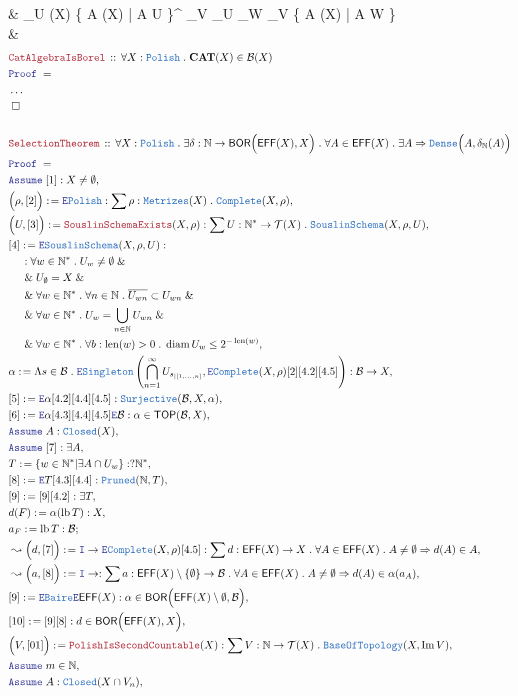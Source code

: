 \documentclass[12pt]{scrartcl}
\newcommand{\TYPE}[1]{\textcolor{NavyBlue}{\mathtt{#1}}}
\newcommand{\LOGIC}[1]{\textcolor{Blue}{\mathtt{#1}}}
\newcommand{\THM}[1]{\textcolor{Maroon}{\mathtt{#1}}}
\renewcommand{\.}{\; . \;}
\newcommand{\de}{: \kern 0.1pc =}
\newcommand{\Theorem}[2]{& \THM{#1} \, :: \, #2 \\ & \Proof = \\ }
\newcommand{\NewLine}{\\ & \kern 1pc}
\newcommand{\Page}[1]{ \begin{align*} #1 \end{align*}   }
\newcommand{\NoProof}{ & \ldots \\ \EndProof}
\renewcommand{\And}{\; \& \;}
\newcommand{\Imply}{\Rightarrow}
\newcommand{\Intro}{\LOGIC{I}}
\newcommand{\Elim}{\LOGIC{E}}
\newcommand{\Nat}{\mathbb{N} }
\DeclareMathOperator*{\im}{Im}
\renewcommand{\c}{\complement}
\newcommand{\Say}[3]{& #1 \de #2 : #3, \\}
\newcommand{\Conclude}[3]{& #1 \de #2 : #3; \\}
\newcommand{\Derive}[3]{& \leadsto #1 \de #2 : #3, \\}
\newcommand{\Assume}[2]{& \LOGIC{Assume} \; #1 : #2, \\}
\newcommand{\AssumeIn}[2]{& \LOGIC{Assume} \; #1 \in #2, \\}
\newcommand{\QED}{\; \square}
\newcommand{\EndProof}{& \QED \\}
\newcommand{\Proof}{\LOGIC{Proof} \; }
\newcommand{\Surj}{\TYPE{Surjective}}
\newcommand{\B}{\mathcal{B}}
\newcommand{\Closed}{\TYPE{Closed}}
\newcommand{\Dense}{\TYPE{Dense}}
\newcommand{\Bair}{\TYPE{Baire}}
\newcommand{\TOP}{\mathsf{TOP}}
\newcommand{\T}{\mathcal{T}}
\newcommand{\Complete}{\TYPE{Complete}}
\DeclareMathOperator{\diam}{diam}
\newcommand{\Cell}{\mathbb{B}}
\newcommand{\FS}[1]{{#1}{}^*}
\newcommand{\Pruned}{\TYPE{Pruned}}
\newcommand{\Polish}{\TYPE{Polish}}
\newcommand{\cat}{\mathbf{CAT}}
\DeclareMathOperator{\len}{len}
\newcommand{\inits}[2]{{#1}_{|\left[1,\ldots,#2\right]}}
\DeclareMathOperator{\lb}{lb}
\newcommand{\BOR}{\mathsf{BOR}}
\newcommand{\Effros}{\mathsf{EFF}}
\begin{document}
{{	}
	&
	\bigcap_{U \in \Cell(X) }     
	\Big\{ A \in \Effros(X) \Big| \exists A \cap U   \Big\}^\c
	\cup
	\bigcup_{V \le_\Cell U} \bigcap_{W \le_\Cell V}	
	\Big\{ A \in \Effros(X) \Big| \exists A \cap W   \Big\}
	\\ 
	\EndProof
}\Page{
	\Theorem{CatAlgebraIsBorel}
	{
		\forall X : \Polish \.
		\cat(X) \in \B(X)
	}
	\NoProof
	\\
	\Theorem{SelectionTheorem}
	{
		\forall X : \Polish \.
		\exists \delta : \Nat \to \BOR\Big(\Effros(X), X \Big) \.
		\forall A \in \Effros(X) \. \exists A \Imply 
		\Dense\Big(  A  , \delta_\Nat(A) \Big)
	}
	\Assume{[1]}{X \neq \emptyset}
	\Say{\Big(\rho,[2]\Big)}{\Elim \Polish}
	{
		\sum \rho : \TYPE{Metrizes}(X) \.
		\Complete(X,\rho)
	}
	\Say{\Big(U,[3]\Big)}{\THM{SouslinSchemaExists}(X,\rho)}
	{
		\sum U : \FS{\Nat}  \to \T(X) \. \TYPE{SouslinSchema}(X,\rho,U)
	}
	\Say{[4]}{\Elim \TYPE{SouslinSchema}(X,\rho,U)}
	{
		\NewLine : 
			\forall w \in \FS{\Nat} \.  
			U_w \neq \emptyset
		\And \NewLine \And
		U_\emptyset = X 
		\And \NewLine \And
			\forall w \in \FS{\Nat} \. 
		  	\forall n \in \Nat \.
		  	\overline{U_{wn}} \subset U_{wn}
		\And \NewLine \And
			\forall w \in \FS{\Nat} \.
			U_w = \bigcup_{n \in \Nat} U_{wn}
		\And \NewLine \And
			\forall w \in \FS{\Nat} \.
			\forall b  : \len(w) > 0 \.
			\diam U_w \le 2^{-\len(w)}
	}
	\Say{\alpha}{\Lambda s \in \B \.  
		\Elim \TYPE{Singleton}\left( 
			\bigcap^\infty_{n=1} U_{\inits{s}{n}},
			\Elim \Complete(X,\rho)[2][4.2][4.5]
		\right)
	}
	{
		\B \to X
	}
	\Say{[5]}{\Elim \alpha [4.2][4.4][4.5]}{ \Surj(\B,X,\alpha) }
	\Say{[6]}{\Elim \alpha [4.3][4.4][4.5]\Elim \B}{\alpha \in \TOP(\B,X)}
	\Assume{A}{\Closed(X)}
	\Assume{[7]}{\exists A}
	\Say{T}{\{ w \in \FS{\Nat} | \exists A \cap U_w  \}}{?\FS{\Nat}}
	\Say{[8]}{\Elim T [4.3][4.4]}{\Pruned(\Nat,T)}
	\Say{[9]}{[9] [4.2]}{\exists T}
	\Say{d(F)}{\alpha(\lb T)}{X}
	\Conclude{a_F}{\lb T}{\B}
	\Derive{\Big(d , [7] \Big)}{\Intro \to \Elim \Complete(X,\rho)[4.5]}
	{
		\sum d : \Effros(X) \to X \. 
		\forall A \in \Effros(X) \.  A \neq \emptyset \Imply d(A) \in A
	}
	\Derive{\Big(a , [8] \Big)}{\Intro \to}
	{
		\sum a : \Effros(X) \setminus \{\emptyset\} \to \B \. 
		\forall A \in \Effros(X) \.  A \neq \emptyset \Imply d(A) \in \alpha(a_A)
	}
	\Say{[9]}{\Elim \Bair \Elim \Effros(X)}{\alpha \in \BOR\Big(\Effros(X) \setminus \emptyset,\B\Big)}
	\Say{[10]}{[9][8]}{d \in \BOR\Big(\Effros(X), X\Big)}
	\Say{\Big(V,[01]\Big)}{\THM{PolishIsSecondCountable}(X)}
	{
		\sum V : \Nat \to \T(X) \. \TYPE{BaseOfTopology}(X,\im V)
	}
	\AssumeIn{m}{\Nat}
	\Assume{A}{\Closed(X \cap V_n)}
}
\end{document}
